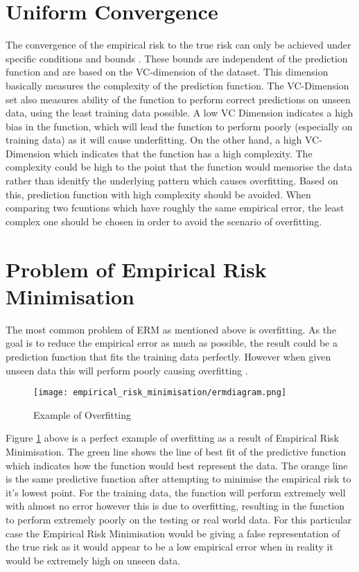 \section{Uniform Convergence}
The convergence of the empirical risk to the true risk can only be achieved under specific conditions and bounds \citep{Clemencon2017}. These bounds are independent of the prediction function and are based on the VC-dimension of the dataset. This dimension basically measures the complexity of the prediction function. The VC-Dimension set also measures ability of the function to perform correct predictions on unseen data, using the least training data possible. A low VC Dimension indicates a high bias in the function, which will lead the function to perform poorly (especially on training data) as it will cause underfitting. On the other hand, a high VC-Dimension which indicates that the function has a high complexity. The complexity could be high to the point that the function would memorise the data rather than idenitfy the underlying pattern which causes overfitting. Based on this, prediction function with high complexity should be avoided. When comparing two fcuntions which have roughly the same empirical error, the least complex one should be chosen in order to avoid the scenario of overfitting.

\section{Problem of Empirical Risk Minimisation}
The most common problem of ERM as mentioned above is overfitting. As the goal is to reduce the empirical error as much as possible, the result could be a prediction function that fits the training data perfectly. However when given unseen data this will perform poorly causing overfitting \citep{UMachineLearning}. 

\begin{figure}[h]
   \texttt{[image: empirical\_risk\_minimisation/ermdiagram.png]}
   \caption{Example of Overfitting} 
   \label{fig:figure1}
\end{figure}
\noindent
Figure \ref{fig:figure1} above is a perfect example of overfitting as a result of Empirical Risk Minimisation. The green line shows the line of best fit of the predictive function which indicates how the function would best represent the data. The orange line is the same predictive function after attempting to minimise the empirical risk to it's lowest point. For the training data, the function will perform extremely well with almost no error however this is due to overfitting, resulting in the function to perform extremely poorly on the testing or real world data. For this particular case the Empirical Risk Minimisation would be giving a false representation of the true risk as it would appear to be a low empirical error when in reality it would be extremely high on unseen data. 


